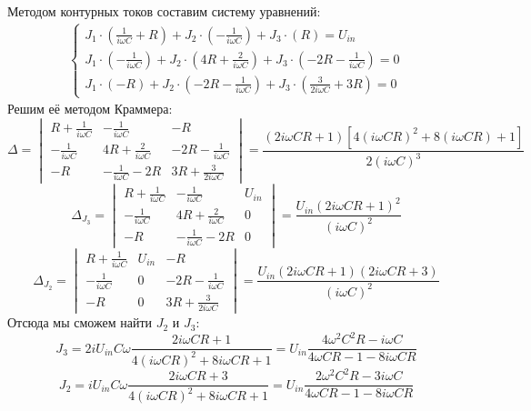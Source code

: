  Методом контурных токов составим систему уравнений:
\begin{gather}
	\left\{
	\begin{aligned}
		J_1\cdot\left(\frac{1}{i\omega C}+R\right)+J_2\cdot\left( -\frac{1}{i\omega C} \right)+J_3\cdot\left(R \right)=U_{in}\\
		J_1\cdot\left(-\frac{1}{i\omega C}\right)+J_2\cdot\left(4R+\frac{2}{i\omega C} \right)+J_3\cdot\left(-2R-\frac{1}{i\omega C} \right)=0\\
		J_1\cdot\left(-R\right)+J_2\cdot\left( -2R-\frac{1}{i\omega C} \right)+J_3\cdot\left(\frac{3}{2i\omega C}+3R \right)=0
	\end{aligned}
	\right.
\end{gather}
Решим её методом Краммера:
\begin{equation}
	\Delta =\begin{vmatrix} 
		R+\frac{1}{i\omega C} & -\frac{1}{i\omega C} & -R\\
		-\frac{1}{i\omega C} & 4R+\frac{2}{i\omega C} & -2R-\frac{1}{i\omega C}\\
		-R & -\frac{1}{i\omega C}-2R & 3R+\frac{3}{2i\omega C}\
	\end{vmatrix}=
\frac{(2i\omega CR+1)[4(i\omega CR)^2+8(i\omega CR)+1]}{2(i\omega C)^3}
\end{equation}
\begin{equation}
	\Delta_{J_3} =\begin{vmatrix} 
		R+\frac{1}{i\omega C} & -\frac{1}{i\omega C} & U_{in}\\
		-\frac{1}{i\omega C} & 4R+\frac{2}{i\omega C} & 0\\
		-R & -\frac{1}{i\omega C}-2R & 0\
	\end{vmatrix}=
	\frac{U_{in}(2i\omega CR+1)^2}{(i\omega C)^2}	
\end{equation}
\begin{equation}
	\Delta_{J_2} =\begin{vmatrix} 
		R+\frac{1}{i\omega C} & U_{in} & -R\\
		-\frac{1}{i\omega C} & 0 & -2R-\frac{1}{i\omega C}\\
		-R & 0 & 3R+\frac{3}{2i\omega C}\
	\end{vmatrix}=
		\frac{U_{in}(2i\omega CR+1)(2i\omega CR+3)}{(i\omega C)^2}	
\end{equation}
Отсюда мы сможем найти $J_2$ и $J_3$:
\begin{equation}
	J_3=2iU_{in}C\omega\frac{2i\omega CR+1}{4(i\omega CR)^2+8i\omega CR+1}=U_{in}\frac{4\omega^2C^2R-i\omega C}{4\omega CR-1-8i\omega CR}
\end{equation}
\begin{equation}
	J_2=iU_{in}C\omega\frac{2i\omega CR+3}{4(i\omega CR)^2+8i\omega CR+1}=U_{in}\frac{2\omega^2C^2R-3i\omega C}{4\omega CR-1-8i\omega CR}
\end{equation}

